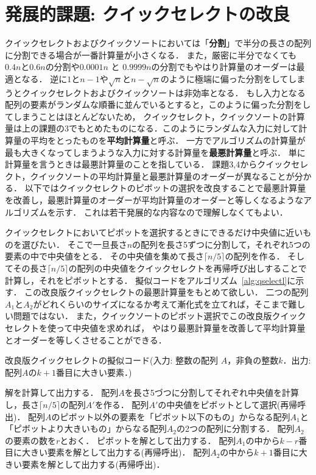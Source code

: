 \documentclass[a4paper,twoside,onecolumn,openany,article]{memoir}
\theoremstyle{remark}
\begin{document}
\section*{発展的課題: クイックセレクトの改良}
クイックセレクトおよびクイックソートにおいては「\textbf{分割}」で半分の長さの配列に分割できる場合が一番計算量が小さくなる．
また，厳密に半分でなくても$0.4 n$と$0.6n$の分割や$0.0001 n$ と $0.9999 n$の分割でもやはり計算量のオーダーは最適となる．
逆に$1$と$n-1$や$\sqrt{n}$と$n-\sqrt{n}$のように極端に偏った分割をしてしまうとクイックセレクトおよびクイックソートは非効率となる．
もし入力となる配列の要素がランダムな順番に並んでいるとすると，このように偏った分割をしてしまうことはほとんどないため，
クイックセレクト，クイックソートの計算量は上の課題の3でもとめたものになる．このようにランダムな入力に対して計算量の平均をとったものを\textbf{平均計算量}と呼ぶ．
一方でアルゴリズムの計算量が最も大きくなってしまうような入力に対する計算量を\textbf{最悪計算量}と呼ぶ．
単に計算量を言うときは最悪計算量のことを指している．
課題3,4からクイックセレクト，クイックソートの平均計算量と最悪計算量のオーダーが異なることが分かる．
以下ではクイックセレクトのピボットの選択を改良することで最悪計算量を改善し，最悪計算量のオーダーが平均計算量のオーダーと等しくなるようなアルゴリズムを示す．
これは若干発展的な内容なので理解しなくてもよい．

クイックセレクトにおいてピボットを選択するときにできるだけ中央値に近いものを選びたい．
そこで一旦長さ$n$の配列を長さ5ずつに分割して，それぞれ5つの要素の中で中央値をとる．
その中央値を集めて長さ$\lceil n/5\rceil$の配列を作る．
そしてその長さ$\lceil n/5\rceil$の配列の中央値をクイックセレクトを再帰呼び出しすることで計算し，それをピボットとする．
擬似コードをアルゴリズム~\ref{alg:qselectl}に示す．
この改良版クイックセレクトの最悪計算量をもとめて欲しい．
二つの配列$A_1$と$A_2$がどれくらいのサイズになるか考えて漸化式を立てれば，そこまで難しい問題ではない．
また，クイックソートのピボット選択でこの改良版クイックセレクトを使って中央値を求めれば，
やはり最悪計算量を改善して平均計算量とオーダーを等しくさせることができる．


\begin{algorithm}
\caption{改良版クイックセレクトの擬似コード(入力: 整数の配列 $A$，非負の整数$k$．出力: 配列$A$の$k+1$番目に大きい要素．)}
\label{alg:qselectl}
\begin{algorithmic}
  \State 解を計算して出力する．
\Else
  \State 配列$A$を長さ5づつに分割してそれぞれ中央値を計算し，長さ$\lceil n/5\rceil$の配列$A'$を作る．
  \State 配列$A'$の中央値をピボットとして選択(再帰呼出)．
  \State 配列$A$のピボット以外の要素を「ピボット以下のもの」からなる配列$A_1$と「ピボットより大きいもの」からなる配列$A_2$の2つの配列に分割する．
  \State 配列$A_2$の要素の数を$r$とおく．
    \State ピボットを解として出力する．
    \State 配列$A_1$の中から$k-r$番目に大きい要素を解として出力する(再帰呼出)．
  \Else
    \State 配列$A_2$の中から$k+1$番目に大きい要素を解として出力する(再帰呼出)．
  \EndIf
\EndIf
\end{algorithmic}
\end{algorithm}
\end{document}
